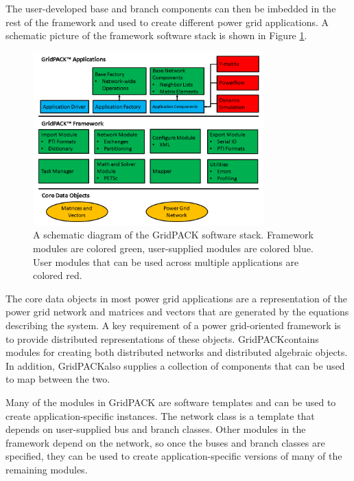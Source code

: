 \documentclass[preprint]{acm_proc_article-sp}
\begin{document}
The user-developed base and branch components can then be imbedded in the rest
of the framework and used to create different power grid applications. A
schematic picture of the framework software stack is shown in Figure
\ref{schematic}.
\begin{figure}
\centering
\includegraphics[width=3.5in,keepaspectratio=true]{./Fig1}
\caption{\label{schematic} A schematic diagram of the GridPACK\texttrademark
software stack. Framework modules are colored green, user-supplied modules are
colored blue. User modules that can be used across multiple applications are
colored red.
}
\end{figure}
The core data objects in most power grid applications are a representation of
the power grid network and matrices and vectors that are generated by the
equations describing the system. A key requirement of a power grid-oriented
framework is to provide distributed representations of these objects.
GridPACK\texttrademark contains modules for creating both distributed networks
and distributed algebraic objects. In addition, GridPACK\texttrademark also
supplies a collection of components that can be used to map between the two.

Many of the modules in GridPACK are software templates and can be used to create
application-specific instances. The network class is a template that depends
on user-supplied bus and branch classes. Other modules in the framework depend
on the network, so once the buses and branch classes are specified, they can be
used to create application-specific versions of many of the remaining modules.
\end{document}
